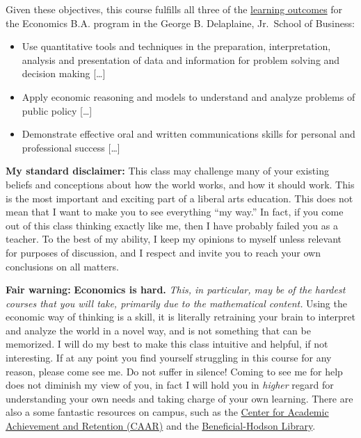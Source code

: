 \documentclass{article}
\providecommand{\tightlist}{%
  \setlength{\itemsep}{0pt}\setlength{\parskip}{0pt}}
\begin{document}
Given these objectives, this course fulfills all three of the
\href{https://www.hood.edu/academics/departments/george-b-delaplaine-jr-school-business/student-learning-outcomes}{learning
outcomes} for the Economics B.A. program in the George B. Delaplaine,
Jr.~School of Business:

\begin{itemize}
\tightlist
\item
  Use quantitative tools and techniques in the preparation,
  interpretation, analysis and presentation of data and information for
  problem solving and decision making {[}\ldots{]}
\item
  Apply economic reasoning and models to understand and analyze problems
  of public policy {[}\ldots{]}
\item
  Demonstrate effective oral and written communications skills for
  personal and professional success {[}\ldots{]}
\end{itemize}

\textbf{My standard disclaimer:} This class may challenge many of your
existing beliefs and conceptions about how the world works, and how it
should work. This is the most important and exciting part of a liberal
arts education. This does not mean that I want to make you to see
everything ``my way.'' In fact, if you come out of this class thinking
exactly like me, then I have probably failed you as a teacher. To the
best of my ability, I keep my opinions to myself unless relevant for
purposes of discussion, and I respect and invite you to reach your own
conclusions on all matters.

\textbf{Fair warning:} \textbf{Economics is hard.} \emph{This, in
particular, may be of the hardest courses that you will take, primarily
due to the mathematical content.} Using the economic way of thinking is
a skill, it is literally retraining your brain to interpret and analyze
the world in a novel way, and is not something that can be memorized. I
will do my best to make this class intuitive and helpful, if not
interesting. If at any point you find yourself struggling in this course
for any reason, please come see me. Do not suffer in silence! Coming to
see me for help does not diminish my view of you, in fact I will hold
you in \emph{higher} regard for understanding your own needs and taking
charge of your own learning. There are also a some fantastic resources
on campus, such as the
\href{http://www.hood.edu/campus-services/academic-services/index.html}{Center
for Academic Achievement and Retention (CAAR)} and the
\href{http://www.hood.edu/library/}{Beneficial-Hodson Library}.
\end{document}
